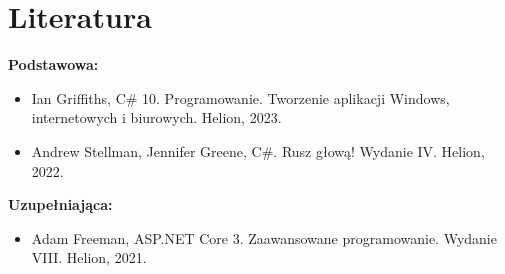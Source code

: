 \documentclass[12pt, a4paper]{article}
\begin{document}
\section{Literatura}

\textbf{Podstawowa:}
\begin{itemize}
  \item Ian Griffiths, C\# 10. Programowanie. Tworzenie aplikacji Windows, internetowych i biurowych. Helion, 2023.
  \item Andrew Stellman, Jennifer Greene, C\#. Rusz głową! Wydanie IV. Helion, 2022.
\end{itemize}

\textbf{Uzupełniająca:}
\begin{itemize}
  \item Adam Freeman, ASP.NET Core 3. Zaawansowane programowanie. Wydanie VIII. Helion, 2021.
\end{itemize}
\end{document}
